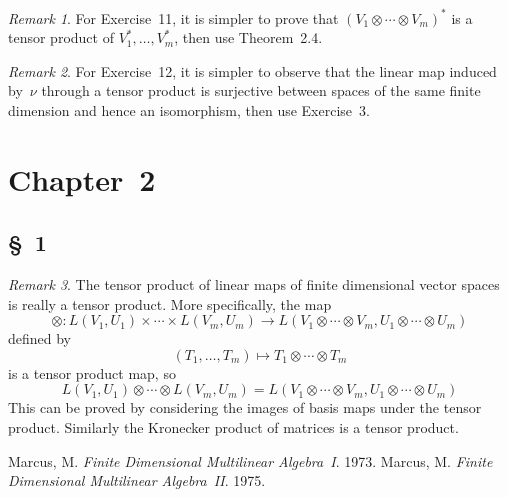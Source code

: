 \documentclass[letterpaper,12pt]{article}
\newcommand{\tprod}{\otimes}
\newcommand{\dual}[1]{#1^*}
\newcommand{\multi}[4]{#2_{#3}#1\cdots#1#2_{#4}}
\newcommand{\tprods}[3]{\multi{\tprod}{#1}{#2}{#3}}
\theoremstyle{definition}
\theoremstyle{remark}
\newtheorem*{rmk}{Remark}
\begin{document}
\begin{rmk}
For Exercise~11, it is simpler to prove that \(\dual{(\tprods{V}{1}{m})}\) is a tensor product of \(\dual{V_1},\ldots,\dual{V_m}\), then use Theorem~2.4.
\end{rmk}

\begin{rmk}
For Exercise~12, it is simpler to observe that the linear map induced by~\(\nu\) through a tensor product is surjective between spaces of the same finite dimension and hence an isomorphism, then use Exercise~3.
\end{rmk}

\section*{Chapter~2}
\subsection*{\S~1}
\begin{rmk}
The tensor product of linear maps of finite dimensional vector spaces is really a tensor product. More specifically, the map
\[\tprod:L(V_1,U_1)\times\cdots\times L(V_m,U_m)\to L(\tprods{V}{1}{m},\tprods{U}{1}{m})\]
defined by
\[(T_1,\ldots,T_m)\mapsto\tprods{T}{1}{m}\]
is a tensor product map, so
\[L(V_1,U_1)\tprod\cdots\tprod L(V_m,U_m)=L(\tprods{V}{1}{m},\tprods{U}{1}{m})\]
This can be proved by considering the images of basis maps under the tensor product. Similarly the Kronecker product of matrices is a tensor product.
\end{rmk}

\newpage
\begin{thebibliography}{0}
 Marcus, M. \textit{Finite Dimensional Multilinear Algebra~I}. 1973.
 Marcus, M. \textit{Finite Dimensional Multilinear Algebra~II}. 1975.
\end{thebibliography}
\end{document}
